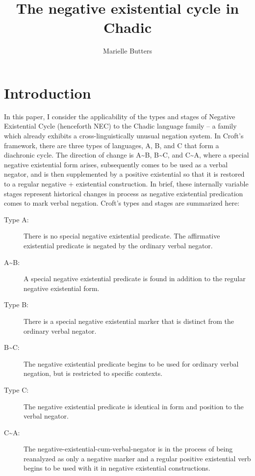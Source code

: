 \documentclass[output=paper,draft,draftmode,colorlinks,citecolor=brown]{langscibook}
\author{Marielle Butters\affiliation{University of Colorado at Boulder}}
\title{The negative existential cycle in Chadic}
\begin{document}
\maketitle

\section{Introduction}\label{sec:3:1}

In this paper, I consider the applicability of the types and stages of  Negative Existential Cycle (henceforth NEC) to the Chadic language family -- a family which already exhibits a cross-linguistically unusual negation system. In Croft's framework, there are three types of languages, A, B, and C that form a diachronic cycle. The direction of change is A{\textasciitilde}B, B{\textasciitilde}C, and C{\textasciitilde}A, where a special negative existential form arises, subsequently comes to be used as a verbal negator, and is then supplemented by a positive existential so that it is restored to a regular negative + existential construction. In brief, these internally variable stages represent historical changes in process as negative existential predication comes to mark verbal negation. Croft's types and stages are summarized here:

\begin{description}
\item[Type A:] There is no special negative existential predicate. The affirmative existential predicate is negated by the ordinary verbal negator.
\item[A{\textasciitilde}B:] A special negative existential predicate is found in addition to the regular negative existential form. 
\item[Type B:] There is a special negative existential marker that is distinct from the ordinary verbal negator. 
\item[B{\textasciitilde}C:] The negative existential predicate begins to be used for ordinary verbal negation, but is restricted to specific contexts. 
\item[Type C:] The negative existential predicate is identical in form and position to the verbal negator.
\item[C{\textasciitilde}A:] The negative-existential-cum-verbal-negator is in the process of being reanalyzed as only a negative marker and a regular positive existential verb begins to be used with it in negative existential constructions.
\end{description}
\end{document}
